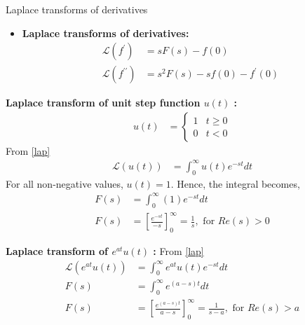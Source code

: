 \documentclass{beamer}
\providecommand{\brak}[1]{\ensuremath{\left(#1\right)}}
\theoremstyle{remark}
\numberwithin{equation}{section}
\begin{document}
\begin{frame}{Laplace transforms of derivatives}
    \begin{itemize}
        \item \textbf{Laplace transforms of derivatives:}
        \begin{align}
			\mathcal{L} \brak{f^{\prime}} &= s F(s) - f(0) \label{dif1} \\
			\mathcal{L} \brak{f^{\prime \prime}} &= s^2 F(s) - s f(0) - f^{\prime}(0) \label{dif2}
        \end{align}
\end{itemize}
\end{frame}
\begin{frame}{\textbf{Laplace transform of unit step function $u(t)$ :}}
		\begin{align}
			u(t) &= 
			\begin{cases} 
				1 & t \geq 0 \\
				0 & t < 0
			\end{cases} \label{ut}
		\end{align}
			From \eqref{lap}
		\begin{align}
			\mathcal{L} \brak{u(t)} &= \int_{0}^{\infty} u(t) e^{-st} dt 
		\end{align}
		For all non-negative values, $u(t) = 1$. Hence, the integral becomes,
		\begin{align}
			F(s) &= \int_{0}^{\infty} (1)e^{-st} dt \\
			F(s) &= \left[ \frac{e^{-st}}{-s} \right]_{0}^{\infty} = \frac{1}{s} ,  \text{ for } Re(s) > 0 \label{eq:first}
		\end{align}
        \end{frame}
\begin{frame}{\textbf{Laplace transform of $e^{at} u(t)$ :}}
		From \eqref{lap}
		\begin{align}
			\mathcal{L} \brak{e^{at} u(t)} &= \int_{0}^{\infty} e^{at} u(t) e^{-st} dt \\
			F(s) &= \int_{0}^{\infty} e^{(a-s)t} dt \\
			F(s) &= \left[\frac{e^{(a-s)t}}{a-s} \right]_{0}^{\infty} = \frac{1}{s-a} , \text{ for } Re(s) > a \label{req}
		\end{align}
\end{frame}
\end{document}
